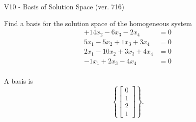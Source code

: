 \begin{exercise}
  \begin{exerciseTitle}V10 - Basis of Solution Space (ver. 716)\end{exerciseTitle}
  \begin{exerciseStatement}
    Find a basis for the solution space of the homogeneous system 
\begin{align*}
 + 14 x_ 2 -6 x_ 3 -2 x_ 4 &= 0  \\ 
  5 x_ 1 -5 x_ 2 + 1 x_ 3 + 3 x_ 4 &= 0  \\ 
  2 x_ 1 -10 x_ 2 + 3 x_ 3 + 4 x_ 4 &= 0  \\ 
  -1 x_ 1 + 2 x_ 3 -4 x_ 4 &= 0  \\ 
 \end{align*}


 
  \end{exerciseStatement}

  \begin{exerciseAnswer}
   A basis is   
\[\left\{\left[\begin{array}{c}
0 \\
1 \\
2 \\
1
\end{array}\right]\right\}.\]

  


  \end{exerciseAnswer}
\end{exercise}